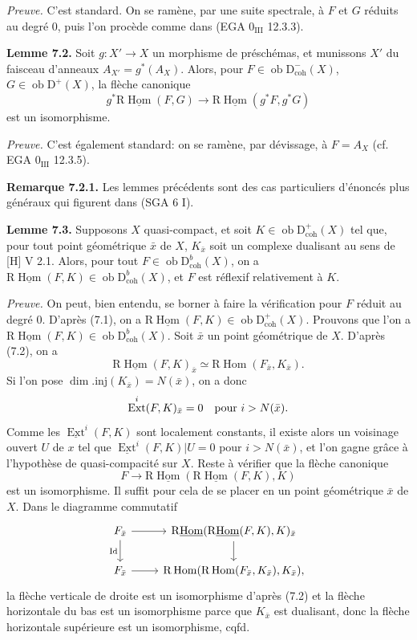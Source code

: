\documentclass[11pt]{article}
\DeclareMathOperator{\Hom}{Hom}
\DeclareMathOperator{\Ext}{Ext}
\newcommand{\R}{\mathrm{R}}
\newcommand{\D}{\mathrm{D}}
\newcommand{\ob}{\operatorname{ob}}
\providecommand{\Hom}{\operatorname{Hom}}
\providecommand{\ob}{\operatorname{ob}}
\begin{document}
\emph{Preuve.} C'est standard. On se ramène, par une suite spectrale, à $F$ et $G$ réduits au degré $0$, puis l'on procède comme dans (EGA $0_{\mathrm{III}}$ 12.3.3).

\textbf{Lemme 7.2.} Soit $g:X'\to X$ un morphisme de préschémas, et munissons $X'$ du faisceau d'anneaux $A_{X'}=g^*(A_X)$. Alors, pour $F\in\ob\D^{-}_{\mathrm{coh}}(X)$, $G\in\ob\D^{+}(X)$, la flèche canonique
\[
        g^*\R\underline{\Hom}(F,G)\longrightarrow \R\underline{\Hom}(g^*F,g^*G)
\]
est un isomorphisme.

\emph{Preuve.} C'est également standard: on se ramène, par dévissage, à $F=A_X$ (cf. EGA $0_{\mathrm{III}}$ 12.3.5).

\textbf{Remarque 7.2.1.} Les lemmes précédents sont des cas particuliers d'énoncés plus généraux qui figurent dans (SGA 6 I).

\textbf{Lemme 7.3.} Supposons $X$ quasi-compact, et soit $K\in\ob\D^{+}_{\mathrm{coh}}(X)$ tel que, pour tout point géométrique $\bar{x}$ de $X$, $K_{\bar{x}}$ soit un complexe dualisant au sens de [H] V 2.1. Alors, pour tout $F\in\ob\D^{b}_{\mathrm{coh}}(X)$, on a $\R\underline{\Hom}(F,K)\in\ob\D^{b}_{\mathrm{coh}}(X)$, et $F$ est réflexif relativement à $K$.

\emph{Preuve.} On peut, bien entendu, se borner à faire la vérification pour $F$ réduit au degré $0$. D'après (7.1), on a $\R\underline{\Hom}(F,K)\in\ob\D^{+}_{\mathrm{coh}}(X)$. Prouvons que l'on a $\R\underline{\Hom}(F,K)\in\ob\D^{b}_{\mathrm{coh}}(X)$. Soit $\bar{x}$ un point géométrique de $X$. D'après (7.2), on a
\[
        \R\underline{\Hom}(F,K)_{\bar{x}}\simeq \R\Hom(F_{\bar{x}},K_{\bar{x}}).
\]
Si l'on pose $\dim.\mathrm{inj}(K_{\bar{x}})=N(\bar{x})$, on a donc
\[
        \Ext^i(F,K)_{\bar{x}}=0\quad\hbox{pour }i>N(\bar{x}).
\]
Comme les $\underline{\Ext}^{i}(F,K)$ sont localement constants, il existe alors un voisinage ouvert $U$ de $x$ tel que $\underline{\Ext}^{i}(F,K)|U=0$ pour $i>N(\bar{x})$, et l'on gagne grâce à l'hypothèse de quasi-compacité sur $X$. Reste à vérifier que la flèche canonique
\[
        F\longrightarrow \R\underline{\Hom}(\R\underline{\Hom}(F,K),K)
\]
est un isomorphisme. Il suffit pour cela de se placer en un point géométrique $\bar{x}$ de $X$. Dans le diagramme commutatif
\[
\begin{tikzcd}
F_{\bar{x}} \arrow[r] \arrow[d,"\mathrm{Id}"'] & \R\underline{\Hom}(\R\underline{\Hom}(F,K),K)_{\bar{x}} \arrow[d]\\
F_{\bar{x}} \arrow[r] & \R\Hom(\R\Hom(F_{\bar{x}},K_{\bar{x}}),K_{\bar{x}}),
\end{tikzcd}
\]
la flèche verticale de droite est un isomorphisme d'après (7.2) et la flèche horizontale du bas est un isomorphisme parce que $K_{\bar{x}}$ est dualisant, donc la flèche horizontale supérieure est un isomorphisme, cqfd.
\end{document}
